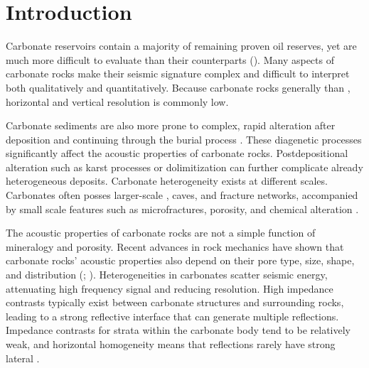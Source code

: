 \section{Introduction}
Carbonate reservoirs contain a majority of remaining proven oil reserves, yet are much more difficult to evaluate than their  counterparts (\citealp{font,overview,eberli,intro}).  Many aspects of carbonate rocks make their seismic signature complex and difficult to interpret both qualitatively and quantitatively.  Because carbonate rocks  generally    than , horizontal and vertical resolution is commonly low.
\par
Carbonate sediments are also more prone to complex, rapid  alteration after deposition and continuing through the burial process \cite[]{van}. These diagenetic processes significantly affect the acoustic properties of carbonate rocks. Postdepositional alteration such as karst processes or dolimitization can further complicate already heterogeneous deposits.  Carbonate heterogeneity exists at different scales.  Carbonates often posses larger-scale , caves, and fracture networks, accompanied by small scale features such as microfractures,  porosity, and chemical alteration \cite[]{lucia}.
\par
The acoustic properties of carbonate rocks are not a simple function of mineralogy and porosity.  Recent advances in rock mechanics have shown that carbonate rocks' acoustic properties also depend on their pore type, size, shape, and distribution (\citealp{wang97,eberli}; \citealp{lud,weger2009}).  Heterogeneities in carbonates scatter seismic energy, attenuating high frequency signal and reducing resolution.  High impedance contrasts typically exist between carbonate structures and surrounding rocks, leading to a strong reflective interface that can generate multiple reflections.  Impedance contrasts for strata within the carbonate body tend to be relatively weak, and horizontal homogeneity means that reflections rarely have strong lateral  .  
